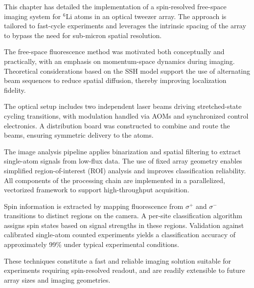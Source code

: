 
This chapter has detailed the implementation of a spin-resolved free-space imaging system for ${}^6$Li atoms in an optical tweezer array. The approach is tailored to fast-cycle experiments and leverages the intrinsic spacing of the array to bypass the need for sub-micron spatial resolution.

The free-space fluorescence method was motivated both conceptually and practically, with an emphasis on momentum-space dynamics during imaging. Theoretical considerations based on the SSH model support the use of alternating beam sequences to reduce spatial diffusion, thereby improving localization fidelity.

The optical setup includes two independent laser beams driving stretched-state cycling transitions, with modulation handled via AOMs and synchronized control electronics. A distribution board was constructed to combine and route the beams, ensuring symmetric delivery to the atoms.

The image analysis pipeline applies binarization and spatial filtering to extract single-atom signals from low-flux data. The use of fixed array geometry enables simplified region-of-interest (ROI) analysis and improves classification reliability. All components of the processing chain are implemented in a parallelized, vectorized framework to support high-throughput acquisition.

Spin information is extracted by mapping fluorescence from $\sigma^+$ and $\sigma^-$ transitions to distinct regions on the camera. A per-site classification algorithm assigns spin states based on signal strengths in these regions. Validation against calibrated single-atom counted experiments yields a classification accuracy of approximately 99\% under typical experimental conditions.

These techniques constitute a fast and reliable imaging solution suitable for experiments requiring spin-resolved readout, and are readily extensible to future array sizes and imaging geometries.
